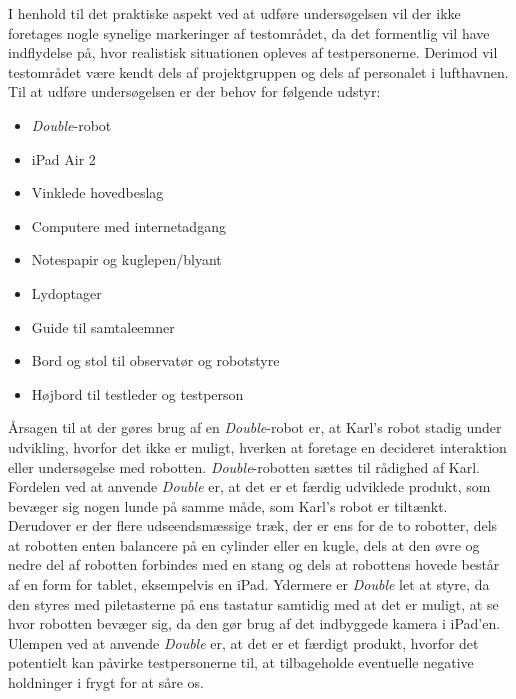 I henhold til det praktiske aspekt ved at udføre undersøgelsen vil der ikke foretages nogle synelige markeringer af testområdet, da det formentlig vil have indflydelse på, hvor realistisk situationen opleves af testpersonerne. Derimod vil testområdet være kendt dels af projektgruppen og dels af personalet i lufthavnen. \blankline
%
Til at udføre undersøgelsen er der behov for følgende udstyr:\blankline
%
\begin{itemize}
  \item \textit{Double}-robot
  \item iPad Air 2
  \item Vinklede hovedbeslag
  \item Computere med internetadgang
  \item Notespapir og kuglepen/blyant
  \item Lydoptager
  \item Guide til samtaleemner
  \item Bord og stol til observatør og robotstyre
  \item Højbord til testleder og testperson\blankline
\end{itemize}
\noindent
%
Årsagen til at der gøres brug af en \textit{Double}-robot er, at Karl's robot stadig under udvikling, hvorfor det ikke er muligt, hverken at foretage en decideret interaktion eller undersøgelse med robotten. \textit{Double}-robotten sættes til rådighed af Karl. Fordelen ved at anvende \textit{Double} er, at det er et færdig udviklede produkt, som bevæger sig nogen lunde på samme måde, som Karl's robot er tiltænkt. Derudover er der flere udseendsmæssige træk, der er ens for de to robotter, dels at robotten enten balancere på en cylinder eller en kugle, dels at den øvre og nedre del af robotten forbindes med en stang og dels at robottens hovede består af en form for tablet, eksempelvis en iPad. Ydermere er \textit{Double} let at styre, da den styres med piletasterne på ens tastatur samtidig med at det er muligt, at se hvor robotten bevæger sig, da den gør brug af det indbyggede kamera i iPad'en. Ulempen ved at anvende \textit{Double} er, at det er et færdigt produkt, hvorfor det potentielt kan påvirke testpersonerne til, at tilbageholde eventuelle negative holdninger i frygt for at såre os. 

